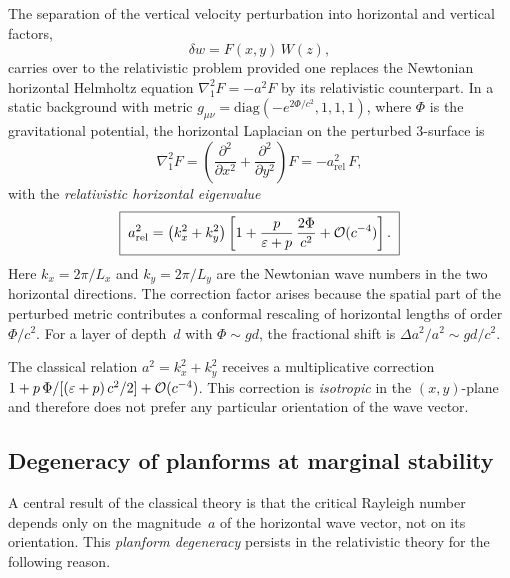 The separation of the vertical velocity perturbation into horizontal
and vertical factors,
\begin{equation}
\label{eq:rel-2-229}
\delta w = F(x,y)\,W(z),
\end{equation}
carries over to the relativistic problem provided one replaces the
Newtonian horizontal Helmholtz equation
$\nabla_{1}^{2}F = -a^{2}F$
by its relativistic counterpart.  In a static background with metric
$g_{\mu\nu} = \mathrm{diag}(-e^{2\Phi/c^{2}},1,1,1)$, where $\Phi$
is the gravitational potential, the horizontal Laplacian on the
perturbed 3-surface is
\begin{equation}
\label{eq:rel-2-228}
\nabla_{1}^{2}F
  = \left(\frac{\partial^{2}}{\partial x^{2}}
       + \frac{\partial^{2}}{\partial y^{2}}\right)F
  = -a_{\mathrm{rel}}^{2}\,F,
\end{equation}
with the \emph{relativistic horizontal eigenvalue}
\begin{equation}
\label{eq:rel-2-237}
\boxed{\;
a_{\mathrm{rel}}^{2}
  = \bigl(k_{x}^{2}+k_{y}^{2}\bigr)
    \left[1 + \frac{p}{\varepsilon + p}
             \,\frac{2\Phi}{c^{2}}
         + \mathcal{O}(c^{-4})\right].
\;}
\end{equation}
Here $k_{x}=2\pi/L_{x}$ and $k_{y}=2\pi/L_{y}$ are the
Newtonian wave numbers in the two horizontal directions.  The
correction factor arises because the spatial part of the perturbed
metric contributes a conformal rescaling of horizontal lengths of
order~$\Phi/c^{2}$.  For a layer of depth~$d$ with
$\Phi\sim gd$, the fractional shift is
$\Delta a^{2}/a^{2}\sim gd/c^{2}$.

\begin{relcorrection}
The classical relation $a^{2}=k_{x}^{2}+k_{y}^{2}$ receives a
multiplicative correction
$1+p\,\Phi/[(\varepsilon+p)\,c^{2}/2]+\mathcal{O}(c^{-4})$.  This
correction is \emph{isotropic} in the $(x,y)$-plane and therefore
does not prefer any particular orientation of the wave vector.
\end{relcorrection}

\subsection{Degeneracy of planforms at marginal stability}\label{sec:rel-16-degeneracy}

A central result of the classical theory is that the critical Rayleigh
number depends only on the magnitude~$a$ of the horizontal wave
vector, not on its orientation.  This \emph{planform degeneracy}
persists in the relativistic theory for the following reason.

